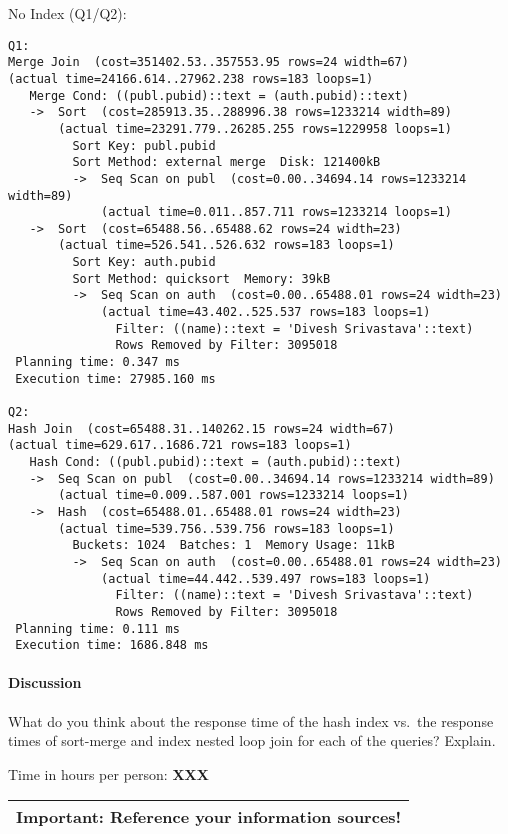 \documentclass[11pt]{scrartcl}
\begin{document}
\noindent No Index (Q1/Q2):
{\small
\begin{verbatim}
Q1:
Merge Join  (cost=351402.53..357553.95 rows=24 width=67)
(actual time=24166.614..27962.238 rows=183 loops=1)
   Merge Cond: ((publ.pubid)::text = (auth.pubid)::text)
   ->  Sort  (cost=285913.35..288996.38 rows=1233214 width=89)
       (actual time=23291.779..26285.255 rows=1229958 loops=1)
         Sort Key: publ.pubid
         Sort Method: external merge  Disk: 121400kB
         ->  Seq Scan on publ  (cost=0.00..34694.14 rows=1233214 width=89)
             (actual time=0.011..857.711 rows=1233214 loops=1)
   ->  Sort  (cost=65488.56..65488.62 rows=24 width=23)
       (actual time=526.541..526.632 rows=183 loops=1)
         Sort Key: auth.pubid
         Sort Method: quicksort  Memory: 39kB
         ->  Seq Scan on auth  (cost=0.00..65488.01 rows=24 width=23)
             (actual time=43.402..525.537 rows=183 loops=1)
               Filter: ((name)::text = 'Divesh Srivastava'::text)
               Rows Removed by Filter: 3095018
 Planning time: 0.347 ms
 Execution time: 27985.160 ms

Q2:
Hash Join  (cost=65488.31..140262.15 rows=24 width=67)
(actual time=629.617..1686.721 rows=183 loops=1)
   Hash Cond: ((publ.pubid)::text = (auth.pubid)::text)
   ->  Seq Scan on publ  (cost=0.00..34694.14 rows=1233214 width=89)
       (actual time=0.009..587.001 rows=1233214 loops=1)
   ->  Hash  (cost=65488.01..65488.01 rows=24 width=23)
       (actual time=539.756..539.756 rows=183 loops=1)
         Buckets: 1024  Batches: 1  Memory Usage: 11kB
         ->  Seq Scan on auth  (cost=0.00..65488.01 rows=24 width=23)
             (actual time=44.442..539.497 rows=183 loops=1)
               Filter: ((name)::text = 'Divesh Srivastava'::text)
               Rows Removed by Filter: 3095018
 Planning time: 0.111 ms
 Execution time: 1686.848 ms
\end{verbatim}
}

\paragraph{Discussion}

What do you think about the response time of the hash index vs.\ the
response times of sort-merge and index nested loop join for each of
the queries? Explain.

\bigskip

\noindent Time in hours per person: {\bf XXX}

\bigskip

\begin{center}
  \begin{tabular}{c}
    \hline
    {\bf Important:} Reference your information sources!
    \\\hline
  \end{tabular}
\end{center}
\end{document}
